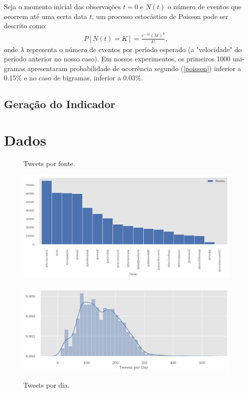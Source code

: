 \documentclass[paper=a4, fontsize=11pt]{scrartcl}
\numberwithin{equation}{section}		%
\numberwithin{figure}{section}			%
\numberwithin{table}{section}				%
\begin{document}
Seja o momento inicial das observações $t=0$ e $N(t)$ o número de eventos que ocorrem até uma certa data $t$, um processo estocástico de Poisson pode ser descrito como:
\begin{align}
	P[N(t)=K]=\frac{e^{-\lambda t} (\lambda t )^k}{k!},\,\! \label{poisson}
\end{align}
onde $\lambda$ representa o número de eventos por período esperado (a "velocidade"  do período anterior no nosso caso).
Em nossos experimentos, os primeiros 1000 uni-gramas apresentaram probabilidade de ocorrência segundo (\ref{poisson}) inferior a 0.15\% e no caso de bigramas, inferior a 0.03\%.
\subsection{Geração do Indicador}
\section{Dados}\label{sec:dados}
\begin{figure}[!h]
  \centering
  \begin{minipage}[t]{0.4\textwidth}
		\caption{Tweets por fonte.}
		\includegraphics[width=\textwidth]{from}
		\label{fig:from}
  \end{minipage}
  \hfill
  \begin{minipage}[t]{0.4\textwidth}
		\caption{Tweets por dia.}
		\includegraphics[width=\textwidth]{perDay}
		\label{fig:daily}
  \end{minipage}
\end{figure}
\end{document}
